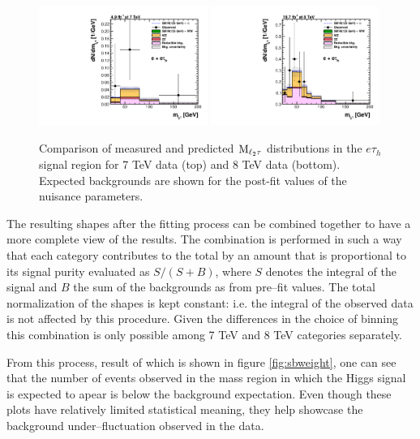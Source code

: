 \begin{figure}
\begin{center}
  \includegraphics[width=0.49\textwidth]{4_Analisys/pics/postfit/eet_postfit_7TeV_FitAllChannels.pdf}
  \includegraphics[width=0.49\textwidth]{4_Analisys/pics/postfit/eet_postfit_8TeV_FitAllChannels.pdf}\\
  \caption{Comparison of measured and predicted $\rm{M}_{\ell_2\tau}$ distributions in the $e\tau_h$ signal region for 7 TeV data (top) and 8 TeV data (bottom). 
    Expected backgrounds are shown for the post-fit values of the nuisance parameters. }
  \label{fig:LLT_eet_postfit}
\end{center}
\end{figure}

The resulting shapes after the fitting process can be combined together to have a more complete view of the results. The combination is performed in such a way that each category contributes to the total by an amount that is proportional to its signal purity evaluated as $S / (S+B)$, where $S$ denotes the integral of the signal and $B$ the sum of the backgrounds as from pre--fit values. The total normalization of the shapes is kept constant: i.e. the integral of the observed data is not affected by this procedure. Given the differences in the choice of binning this combination is only possible among 7 TeV and 8 TeV categories separately. 

From this process, result of which is shown in figure \ref{fig:sbweight}, one can see that the number of events observed in the mass region in which the Higgs signal is expected to apear is below the background expectation.%
Even though these plots have relatively limited statistical meaning, they help showcase the background under--fluctuation observed in the data.

